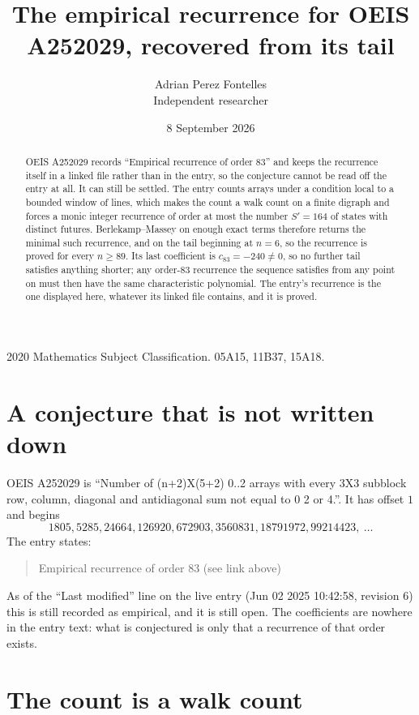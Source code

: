 \documentclass[11pt,a4paper]{article}
\title{The empirical recurrence for OEIS A252029, recovered from its tail}
\author{Adrian Perez Fontelles\\ \small Independent researcher}
\date{8 September 2026}
\theoremstyle{plain}
\theoremstyle{definition}
\begin{document}
\maketitle

\begin{abstract}
OEIS A252029 records ``Empirical recurrence of order $83$'' and keeps the recurrence itself in
a linked file rather than in the entry, so the conjecture cannot be read off the entry at all.
It can still be settled. The entry counts arrays under a condition local to a bounded window of
lines, which makes the count a walk count on a finite digraph and forces a monic integer
recurrence of order at most the number $S'=164$ of states with distinct futures. Berlekamp--Massey on
enough exact terms therefore returns the minimal such recurrence, and on the tail beginning at $n=6$, so the recurrence is proved for every $n\ge89$.
Its last coefficient is $c_{83}=-240\neq0$, so no further tail satisfies anything
shorter; any order-$83$ recurrence the sequence satisfies from any point on must then have
the same characteristic polynomial. The entry's recurrence is the one displayed here, whatever
its linked file contains, and it is proved.
\end{abstract}

\noindent\small 2020 Mathematics Subject Classification. 05A15, 11B37, 15A18.\normalsize

\section{A conjecture that is not written down}

OEIS A252029 is ``Number of (n+2)X(5+2) 0..2 arrays with every 3X3 subblock row, column, diagonal and antidiagonal sum not equal to 0 2 or 4.''. It has offset $1$ and begins
\[
1805, 5285, 24664, 126920, 672903, 3560831, 18791972, 99214423,\ \dots
\]
The entry states:
\begin{quote}
Empirical recurrence of order 83 (see link above)
\end{quote}
As of the ``Last modified'' line on the live entry (Jun 02 2025 10:42:58, revision 6)
this is still recorded as empirical, and it is still open. The coefficients are nowhere in the
entry text: what is conjectured is only that a recurrence of that order exists.

\section{The count is a walk count}
\end{document}
